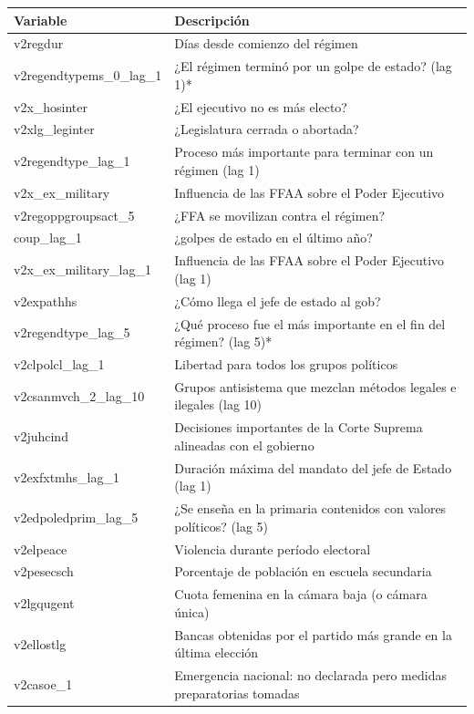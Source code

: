 \documentclass{article}
\begin{document}
\begin{table}[H]
  \begin{tabular}{ll}
    \toprule
    Variable & Descripción \\
    \midrule
    v2regdur & Días desde comienzo del régimen \\
    v2regendtypems\_0\_lag\_1 & ¿El régimen terminó por un golpe de estado? (lag 1)* \\
    v2x\_hosinter & ¿El ejecutivo no es más electo? \\
    v2xlg\_leginter & ¿Legislatura cerrada o abortada? \\
    v2regendtype\_lag\_1 & Proceso más importante para terminar con un régimen (lag 1) \\
    v2x\_ex\_military & Influencia de las FFAA sobre el Poder Ejecutivo \\
    v2regoppgroupsact\_5 & ¿FFA se movilizan contra el régimen? \\
    coup\_lag\_1 & ¿golpes de estado en el último año? \\
    v2x\_ex\_military\_lag\_1 & Influencia de las FFAA sobre el Poder Ejecutivo (lag 1) \\
    v2expathhs & ¿Cómo llega el jefe de estado al gob? \\
    v2regendtype\_lag\_5 & ¿Qué proceso fue el más importante en el fin del régimen? (lag 5)* \\
    v2clpolcl\_lag\_1 & Libertad para todos los grupos políticos \\
    v2csanmvch\_2\_lag\_10 & Grupos antisistema que mezclan métodos legales e ilegales (lag 10) \\
    v2juhcind & Decisiones importantes de la Corte Suprema alineadas con el gobierno \\
    v2exfxtmhs\_lag\_1 & Duración máxima del mandato del jefe de Estado (lag 1) \\
    v2edpoledprim\_lag\_5 & ¿Se enseña en la primaria contenidos con valores políticos? (lag 5) \\
    v2elpeace & Violencia durante período electoral \\
    v2pesecsch & Porcentaje de población en escuela secundaria \\
    v2lgqugent & Cuota femenina en la cámara baja (o cámara única) \\
    v2ellostlg & Bancas obtenidas por el partido más grande en la última elección \\
    v2casoe\_1 & Emergencia nacional: no declarada pero medidas preparatorias tomadas \\

\end{tabular}
\end{table}
\end{document}
